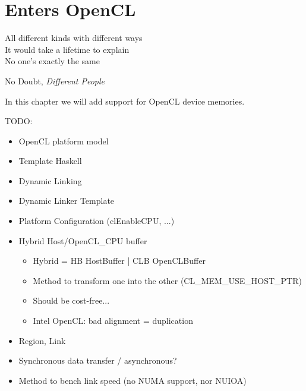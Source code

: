 \chapter{Enters OpenCL}

\epigraph{
All different kinds with different ways\\
It would take a lifetime to explain\\
No one's exactly the same}
{No Doubt, \textit{Different People}}

In this chapter we will add support for OpenCL device memories.

TODO: 
\begin{itemize}
   \item OpenCL platform model
   \item Template Haskell
   \item Dynamic Linking
   \item Dynamic Linker Template
   \item Platform Configuration (clEnableCPU, ...)
   \item Hybrid Host/OpenCL\_CPU buffer
   \begin{itemize}
      \item Hybrid = HB HostBuffer | CLB OpenCLBuffer
      \item Method to transform one into the other (CL\_MEM\_USE\_HOST\_PTR)
      \item Should be cost-free...
      \item Intel OpenCL: bad alignment = duplication
   \end{itemize}
   \item Region, Link
   \item Synchronous data transfer / asynchronous?
   \item Method to bench link speed (no NUMA support, nor NUIOA)
\end{itemize}

